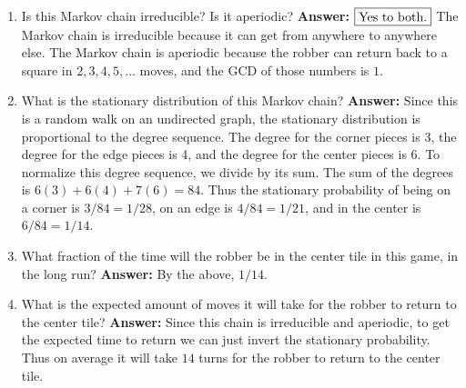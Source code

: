 \documentclass[10pt,landscape]{article}
\begin{document}
\begin{multicols*}{3}
\begin{center}
\end{center}

\begin{enumerate}[label=(\alph*)]
    \item Is this Markov chain irreducible? Is it aperiodic? \textbf{Answer:} $\boxed{\textnormal{Yes to both.}}$ The Markov chain is irreducible because it can get from anywhere to anywhere else. The Markov chain is  aperiodic because the robber can return back to a square in $2, 3, 4, 5, \dots$ moves, and the GCD of those numbers is $1$.
        \item What is the stationary distribution of this Markov chain? \textbf{Answer:} Since this is a random walk on an undirected graph, the stationary distribution is proportional to the degree sequence. The degree for the corner pieces is 3, the degree for the edge pieces is 4, and the degree for the center pieces is 6. To normalize this degree sequence, we divide by its sum. The sum of the degrees is $6(3) + 6(4) + 7(6) = 84$. Thus the stationary probability of being on a corner is $3/84 = 1/28$, on an edge is $4/84 =  1/21$, and in the center is $6/84 = 1/14$.
    \item What fraction of the time will the robber be in the center tile in this game, in the long run? \textbf{Answer:} By the above, $\boxed{1/14}$.
    \item What is the expected amount of moves it will take for the robber to return to the center tile? \textbf{Answer:} Since this chain is irreducible and aperiodic, to get the expected time to return we can just invert the stationary probability. Thus on average it will take $\boxed{14}$ turns for the robber to return to the center tile.
\end{enumerate}



\end{multicols*}
\end{document}
